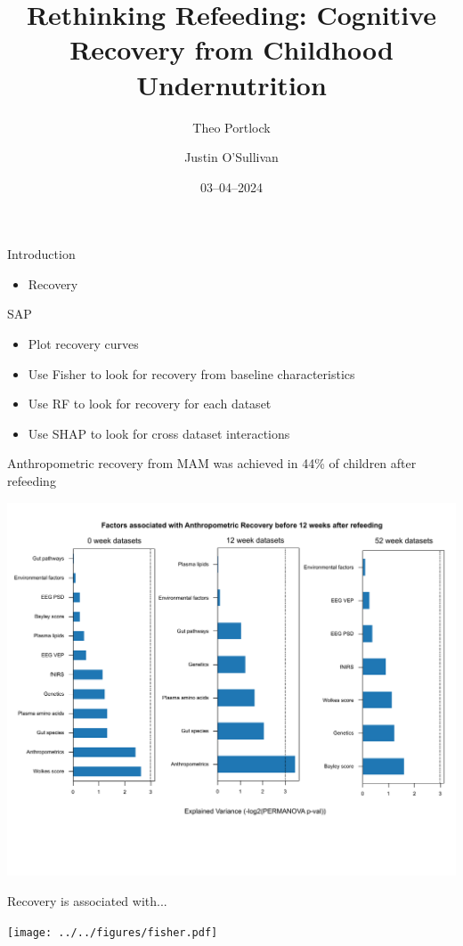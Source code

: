 \documentclass{beamer}
\title{Rethinking Refeeding: Cognitive Recovery from Childhood Undernutrition}
\author{Theo Portlock\inst{1} \and Justin O'Sullivan\inst{1}}
\institute{\inst{1}University of Auckland}
\date{03--04--2024}
\begin{document}
\frame{\titlepage}

\begin{frame}{Introduction}
\begin{itemize}
  \item Recovery
\end{itemize}
\end{frame}

\begin{frame}{SAP}
\begin{itemize}
  \item Plot recovery curves
  \item Use Fisher to look for recovery from baseline characteristics
  \item Use RF to look for recovery for each dataset
  \item Use SHAP to look for cross dataset interactions
\end{itemize}
\end{frame}

\begin{frame}{Anthropometric recovery from MAM was achieved in 44\% of children after refeeding}
\begin{center}
  \includegraphics[width=\linewidth]{../../figures/timerecovery.pdf}
\end{center}
\end{frame}

\begin{frame}{Recovery is associated with...}
\begin{center}
  \texttt{[image: ../../figures/fisher.pdf]}
\end{center}
\end{frame}
\end{document}
